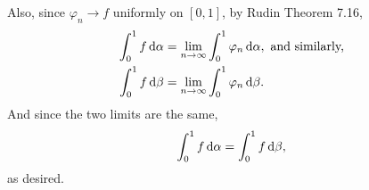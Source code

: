 \documentclass[12pt]{article}
\begin{document}
\begin{fproof}[3(a)]
Also, since \(\varphi_n \to f\) uniformly on \([0,1]\), by Rudin Theorem 7.16,
\begin{align*}
    \int_{0}^{1} f \mathop{}\!\mathrm{d}\alpha &= \lim_{n \to \infty} \int_{0}^{1} \varphi_n \mathop{}\!\mathrm{d}\alpha, \text{ and similarly,}\\
    \int_{0}^{1} f \mathop{}\!\mathrm{d}\beta &= \lim_{n \to \infty} \int_{0}^{1} \varphi_n \mathop{}\!\mathrm{d}\beta.
\end{align*}
And since the two limits are the same,
\begin{align*}
    \int_{0}^{1} f \mathop{}\!\mathrm{d}\alpha = \int_{0}^{1} f \mathop{}\!\mathrm{d}\beta,
\end{align*}
as desired.
\end{fproof}

\begin{fproof}[3(b)]
  
\end{fproof}
\newpage

\begin{fproof}[4]

\end{fproof}
\newpage

\begin{fproof}[5]

\end{fproof}
\end{document}
